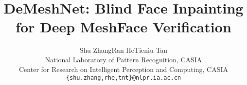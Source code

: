 \documentclass[10pt,twocolumn,letterpaper]{article}
\begin{document}
\title{DeMeshNet: Blind Face Inpainting for Deep MeshFace Verification}

\author{Shu Zhang\quad Ran He\quad Tieniu Tan\\
National Laboratory of Pattern Recognition, CASIA\\
Center for Research on Intelligent Perception and Computing, CASIA\\
{\tt\small \{shu.zhang,rhe,tnt\}@nlpr.ia.ac.cn}
}

\maketitle
\end{document}
